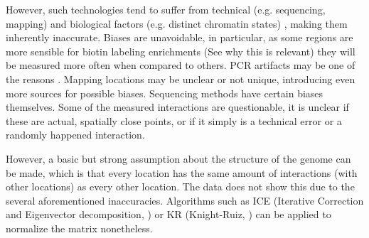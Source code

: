 However, such technologies tend to suffer from technical (e.g. sequencing,
mapping) \cite{pmid21646344} and biological factors (e.g. distinct chromatin
states) \cite{pmid19693276}, making them inherently inaccurate.  Biases are
unavoidable, in particular, as some regions are more sensible for biotin
labeling enrichments (See  why this is relevant) they will be
measured more often when compared to others. PCR artifacts may be one of the
reasons \cite{winget2015hicup}. Mapping locations may be unclear or not unique,
introducing even more sources for possible biases. Sequencing methods
have certain biases themselves. Some of the measured interactions are
questionable, it is unclear if these are actual, spatially close points, or if
it simply is a technical error or a randomly happened interaction.

However, a basic but strong assumption about the structure of the genome can be
made, which is that every location has the same amount of interactions (with
other locations) as every other location. The data does not show this due to
the several aforementioned inaccuracies. Algorithms such as ICE
\cite{imakaev2012iterative} (Iterative Correction and Eigenvector
decomposition, ) or KR \cite{knight2013fast} (Knight-Ruiz,
) can be applied to normalize the matrix nonetheless.



